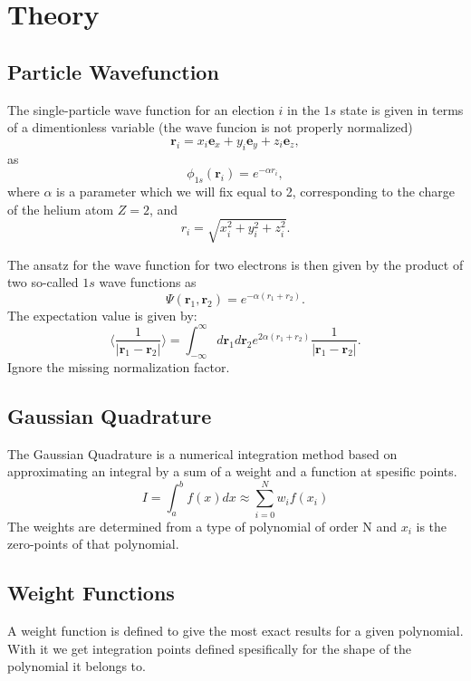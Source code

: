 \documentclass{emulateapj}
\begin{document}
	\section{Theory}
	\label{sec:theory}
	\subsection{Particle Wavefunction} \label{sub:wave}
	The single-particle wave function for an election $i$ in the $1s$ state is given in terms of a dimentionless variable (the wave funcion is not properly normalized)
	$$
	\textbf{r}_i = x_i\textbf{e}_x + y_i\textbf{e}_y + z_i\textbf{e}_z,
	$$
	as
	$$
	\phi_{1s}(\textbf{r}_i) = e^{-\alpha r_i},
	$$
	where $\alpha$ is a parameter which we will fix equal to 2, corresponding to the charge of the helium atom $Z = 2$, and
	$$
	r_i = \sqrt{x_i^2 + y_i^2 + z_i^2}.
	$$
	
	The ansatz for the wave function for two electrons is then given by the product of two so-called $1s$ wave functions as $$
	\Psi (\textbf{r}_1,\textbf{r}_2) = e^{-\alpha (r_1 + r_2)}.
	$$
	The expectation value is given by:
	\begin{equation} \label{eq:1}
	\langle \frac{1}{|\textbf{r}_1 - \textbf{r}_2|} \rangle = \int_{-\infty}^{\infty} d\textbf{r}_1 d\textbf{r}_2 e^{2\alpha(r_1+r_2)}\frac{1}{|\textbf{r}_1 - \textbf{r}_2|}.
	\end{equation}
	Ignore the missing normalization factor.
	
	\subsection{Gaussian Quadrature} \label{sub:Gauss}
	The Gaussian Quadrature is a numerical integration method based on approximating an integral by a sum of a weight and a function at spesific points.
	\begin{equation*}
	I = \int_{a}^{b} f(x) dx \approx \sum_{i = 0}^{N} w_{i} f(x_i)
	\end{equation*}
	The weights are determined from a type of polynomial of order N and $x_i$ is the zero-points of that polynomial.
	
	\subsection{Weight Functions} \label{sub:weight}
	A weight function is defined to give the most exact results for a given polynomial. With it we get integration points defined spesifically for the shape of the polynomial it belongs to.
	
\end{document}
